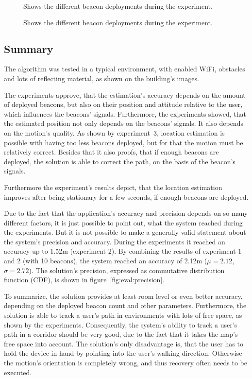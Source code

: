 \begin{figure}
	
	\caption{Shows the different beacon deployments during the experiment.}
	\label{fig:exp3_imgs}
\end{figure}

\begin{figure}
	
	\caption{Shows the different beacon deployments during the experiment.}
\end{figure}


\subsection*{Summary}
The algorithm was tested in a typical environment, with enabled WiFi, obstacles and lots of reflecting material, as shown on the building's images.

The experiments approve, that the estimation's accuracy depends on the amount of deployed beacons, but also on their position and attitude relative to the user, which influences the beacons' signals. Furthermore, the experiments showed, that the estimated position not only depends on the beacons' signals. It also depends on the motion's quality. As shown by experiment~3, location estimation is possible with having too less beacons deployed, but for that the motion must be relatively correct. Besides that it also proofs, that if enough beacons are deployed, the solution is able to correct the path, on the basis of the beacon's signals.

Furthermore the experiment's results depict, that the location estimation improves after being stationary for a few seconds, if enough beacons are deployed.

Due to the fact that the application's accuracy and precision depends on so many different factors, it is just possible to point out, what the system reached during the experiments. But it is not possible to make a generally valid statement about the system's precision and accuracy. During the experiments it reached an accuracy up to 1.52m (experiment 2). By combining the results of experiment 1 and 2 (with 10 beacons), the system reached an accuracy of 2.12m ($\mu=2.12$, $\sigma=2.72$). The solution's precision, expressed as commutative distribution function (CDF), is shown in figure~\ref{fig:eval:precision}.

To summarize, the solution provides at least room level or even better accuracy, depending on the deployed beacon count and other parameters. Furthermore, the solution is able to track a user's path in environments with lots of free space, as shown by the experiments. Consequently, the system's ability to track a user's path in a corridor should be very good, due to the fact that it takes the map's free space into account. The solution's only disadvantage is, that the user has to hold the device in hand by pointing into the user's walking direction. Otherwise the motion's orientation is completely wrong, and thus recovery often needs to be executed.

